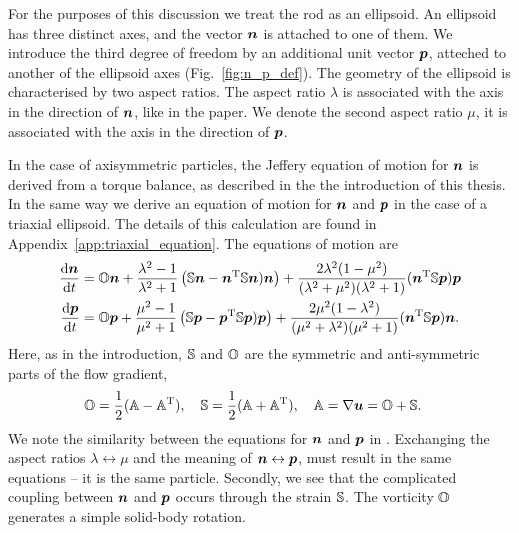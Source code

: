 \documentclass[thesis.tex]{subfiles}
\begin{document}
For the purposes of this discussion we treat the rod as an ellipsoid. An ellipsoid has three distinct axes, and the vector $\mbox{\boldmath$n$}$ is attached to one of them. We introduce the third degree of freedom by an additional unit vector $\mbox{\boldmath$p$}$, atteched to another of the ellipsoid axes (Fig.~\ref{fig:n_p_def}). The geometry of the ellipsoid is characterised by two aspect ratios. The aspect ratio $\lambda$ is associated with the axis in the direction of $\mbox{\boldmath$n$}$, like in the paper. We denote the second aspect ratio $\mu$, it is associated with the axis in the direction of $\mbox{\boldmath$p$}$. 

In the case of axisymmetric particles, the Jeffery equation of motion for $\mbox{\boldmath$n$}$ is derived from a torque balance, as described in the the introduction of this thesis. In the same way we derive an equation of motion for $\mbox{\boldmath$n$}$ and $\mbox{\boldmath$p$}$ in the case of a triaxial ellipsoid. The details of this calculation are found in Appendix~\ref{app:triaxial_equation}. The equations of motion are
\begin{align}
	\diff{\ve{n}}{t} &= \ma O \ve{n} + \frac{\lambda^2-1}{\lambda^2+1} \left(\ma S \ve n- \ve{n}\transpose \ma S \ve{n})\ve{n}\right) + \frac{ 2\lambda^2 (1 - \mu^2) }{(\lambda^2+\mu^2)(\lambda^2+1)}(\ve{n}\transpose \ma S \ve{p})\ve{p} \nn\\
	\diff{\ve{p}}{t} &= \ma O \ve{p} + \frac{\mu^2-1}{\mu^2+1}\left(\ma S \ve p - \ve{p}\transpose \ma S \ve{p})\ve{p}\right) + \frac{ 2\mu^2 (1 - \lambda^2) }{(\mu^2+\lambda^2)(\mu^2+1)}(\ve{n}\transpose \ma S \ve{p})\ve{n}.\eqnlab{triaxial_equation}
\end{align}
Here, as in the introduction, $\mathbb{S}$ and $\mathbb{O}$ are the symmetric and anti-symmetric parts of the flow gradient,
\begin{align*}
	&\mathbb{O} = \frac{1}{2}(\mathbb{A} - \mathbb{A}^{\mathrm T}),\quad
	\mathbb{S} = \frac{1}{2}(\mathbb{A} + \mathbb{A}^{\mathrm T}),\quad
	\mathbb{A} = \nabla \mbox{\boldmath$u$} = \mathbb{O} + \mathbb{S}.
\end{align*}
We note the similarity between the equations for $\mbox{\boldmath$n$}$ and $\mbox{\boldmath$p$}$ in . Exchanging the aspect ratios $\lambda \leftrightarrow \mu$ and the meaning of $\mbox{\boldmath$n$} \leftrightarrow \mbox{\boldmath$p$}$, must result in the same equations -- it is the same particle. Secondly, we see that the complicated coupling between $\mbox{\boldmath$n$}$ and $\mbox{\boldmath$p$}$ occurs through the strain $\mathbb{S}$. The vorticity $\mathbb{O}$ generates a simple solid-body rotation.
\end{document}
